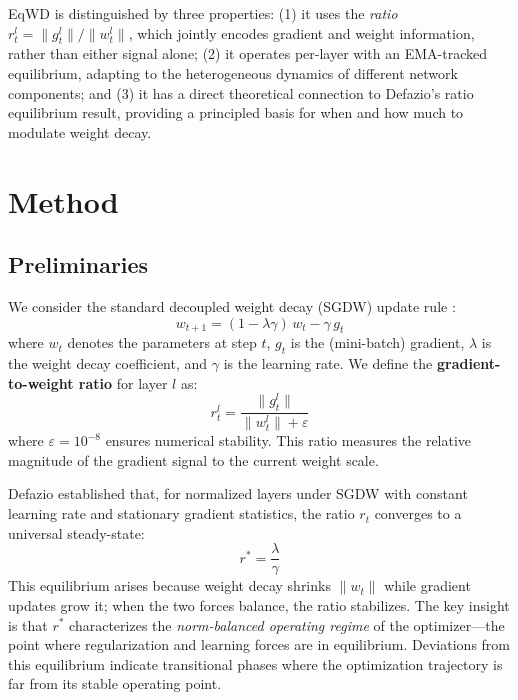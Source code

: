 \documentclass{article}
\begin{document}
EqWD is distinguished by three properties: (1) it uses the \emph{ratio}
$r_t^l = \|g_t^l\| / \|w_t^l\|$, which jointly encodes gradient and
weight information, rather than either signal alone; (2) it operates
per-layer with an EMA-tracked equilibrium, adapting to the heterogeneous
dynamics of different network components; and (3) it has a direct
theoretical connection to Defazio's ratio equilibrium result, providing
a principled basis for when and how much to modulate weight decay.


\section{Method}
\label{sec:method}

\subsection{Preliminaries}
\label{sec:prelim}

We consider the standard decoupled weight decay (SGDW) update rule
\citep{loshchilov2019adamw}:
\begin{equation}
w_{t+1} = (1 - \lambda \gamma)\, w_t - \gamma\, g_t
\end{equation}
where $w_t$
denotes the parameters at step $t$, $g_t$ is the (mini-batch)
gradient, $\lambda$ is the weight decay coefficient, and $\gamma$ is
the learning rate. We define the \textbf{gradient-to-weight ratio} for
layer $l$ as:
\begin{equation}
r_t^l = \frac{\|g_t^l\|}{\|w_t^l\| + \varepsilon}
\end{equation}
where $\varepsilon = 10^{-8}$ ensures numerical stability. This ratio
measures the relative magnitude of the gradient signal to the current
weight scale.

Defazio \citep{defazio2025} established that, for normalized layers under
SGDW with constant learning rate and stationary gradient statistics, the
ratio $r_t$ converges to a universal steady-state:
\begin{equation}
r^* = \frac{\lambda}{\gamma}
\end{equation}
This equilibrium arises because weight
decay shrinks $\|w_t\|$ while gradient updates grow it; when the two
forces balance, the ratio stabilizes. The key insight is that $r^*$
characterizes the \emph{norm-balanced operating regime} of the
optimizer---the point where regularization and learning forces are in
equilibrium. Deviations from this equilibrium indicate transitional
phases where the optimization trajectory is far from its stable
operating point.
\end{document}
